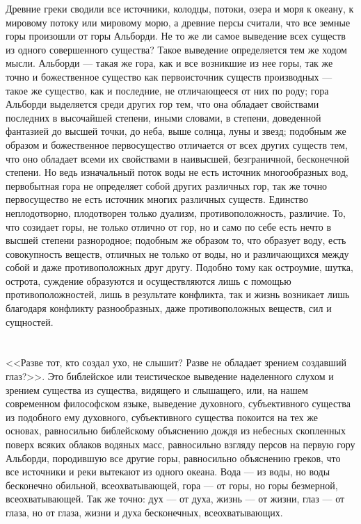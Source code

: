 \documentclass[12pt]{article}
\begin{document}
Древние греки сводили все источники, колодцы, потоки, озера и моря к океану, к мировому потоку или мировому морю, а древние персы считали, что все земные горы произошли от горы Альборди. Не то же ли самое выведение всех существ из одного совершенного существа? Такое выведение определяется тем же ходом мысли. Альборди --- такая же гора, как и все возникшие из нее горы, так же точно и божественное существо как первоисточник существ производных --- такое же существо, как и последние, не отличающееся от них по роду; гора Альборди выделяется среди других гор тем, что она обладает свойствами последних в высочайшей степени, иными словами, в степени, доведенной фантазией до высшей точки, до неба, выше солнца, луны и звезд; подобным же образом и божественное первосущество отличается от всех других существ тем, что оно обладает всеми их свойствами в наивысшей, безграничной, бесконечной степени. Но ведь изначальный поток воды не есть источник многообразных вод, первобытная гора не определяет собой других различных гор, так же точно первосущество не есть источник многих различных существ. Единство неплодотворно, плодотворен только дуализм, противоположность, различие. То, что созидает горы, не только отлично от гор, но и само по себе есть нечто в высшей степени разнородное; подобным же образом то, что образует воду, есть совокупность веществ, отличных не только от воды, но и различающихся между собой и даже противоположных друг другу. Подобно тому как остроумие, шутка, острота, суждение образуются и осуществляются лишь с помощью противоположностей, лишь в результате конфликта, так и жизнь возникает лишь благодаря конфликту разнообразных, даже противоположных веществ, сил и сущностей.



\section{}

<<Разве тот, кто создал ухо, не слышит? Разве не обладает зрением создавший глаз?>>. Это библейское или теистическое выведение наделенного слухом и зрением существа из существа, видящего и слышащего, или, на нашем современном философском языке, выведение духовного, субъективного существа из подобного ему духовного, субъективного существа покоится на тех же основах, равносильно библейскому объяснению дождя из небесных скопленных поверх всяких облаков водяных масс, равносильно взгляду персов на первую гору Альборди, породившую все другие горы, равносильно объяснению греков, что все источники и реки вытекают из одного океана. Вода --- из воды, но воды бесконечно обильной, всеохватывающей, гора --- от горы, но горы безмерной, всеохватывающей. Так же точно: дух --- от духа, жизнь --- от жизни, глаз --- от глаза, но от глаза, жизни и духа бесконечных, всеохватывающих.
\end{document}
